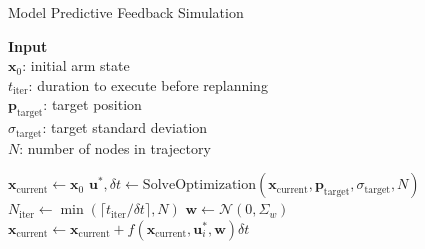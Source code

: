 \documentclass[letterpaper, 10pt, conference]{ieeeconf}
\begin{document}
\begin{algorithm}
\caption{Model Predictive Feedback Simulation}\label{alg:mpc}
 \hspace*{\algorithmicindent} \textbf{Input} \\
    \hspace*{\algorithmicindent} \quad $\mathbf{x}_0$: initial arm state \\
    \hspace*{\algorithmicindent} \quad $t_{\text{iter}}$: duration to execute before replanning \\
    \hspace*{\algorithmicindent} \quad $\mathbf{p}_{\text{target}}$: target position \\
    \hspace*{\algorithmicindent} \quad $\sigma_{\text{target}}$: target standard deviation \\
    \hspace*{\algorithmicindent} \quad $N$: number of nodes in trajectory 
\begin{algorithmic}
\State $\mathbf{x}_{\text{current}} \gets \mathbf{x}_0$
    \State $\mathbf{u}^*, \delta t \gets \text{SolveOptimization}(\mathbf{x}_{\text{current}}, \mathbf{p}_{\text{target}}, \sigma_{\text{target}}, N)$
    \State $N_{\text{iter}} \gets \min(\lceil t_{\text{iter}} / \delta t \rceil, N)$
        \State $\mathbf{w} \gets \mathcal{N}(0, \Sigma_w)$
        \State $\mathbf{x}_{\text{current}} \gets \mathbf{x}_{\text{current}} + f(\mathbf{x}_{\text{current}}, \mathbf{u}_i^*, \mathbf{w}) \delta t$
    \EndFor
\EndWhile
\end{algorithmic}
\end{algorithm}
\end{document}
